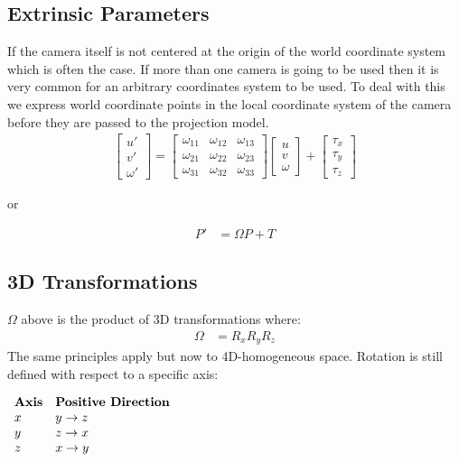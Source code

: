 \documentclass{article}
\begin{document}
\subsection{Extrinsic Parameters}
If the camera itself is not centered at the origin of the world coordinate system which is often the case. 
If more than one camera is going to be used then it is very common for an arbitrary coordinates system to be used.
To deal with this we express world coordinate points in the local coordinate system of the camera before they are passed to the projection model.
\begin{align*}
	\begin{bmatrix}
		u' \\ v' \\ \omega'
	\end{bmatrix}
	=
	\begin{bmatrix}
		\omega_{11} & \omega_{12} & \omega_{13} \\
		\omega_{21} & \omega_{22} & \omega_{23} \\
		\omega_{31} & \omega_{32} & \omega_{33}
	\end{bmatrix}
	\begin{bmatrix}
		u \\ v \\ \omega
	\end{bmatrix}
	+
	\begin{bmatrix}
		\tau_x \\ \tau_y \\ \tau_z
	\end{bmatrix}
\end{align*}
\centerline{or}
\begin{align*}
	P' &= \Omega P + T
\end{align*}
\subsection{3D Transformations}
{\bf $\Omega$} above is the product of 3D transformations where:
\begin{align*}
	\Omega &= R_xR_yR_z
\end{align*}
The same principles apply but now to 4D-homogeneous space.
Rotation is still defined with respect to a specific axis:

\bigskip
\begin{center}$
\begin{array}{l l}
	\mbox{{\bf Axis}} & \mbox{{\bf Positive Direction}} \\
	x & y \rightarrow z \\
	y & z \rightarrow x \\
	z & x \rightarrow y \\
\end{array}$
\end{center}
\end{document}
